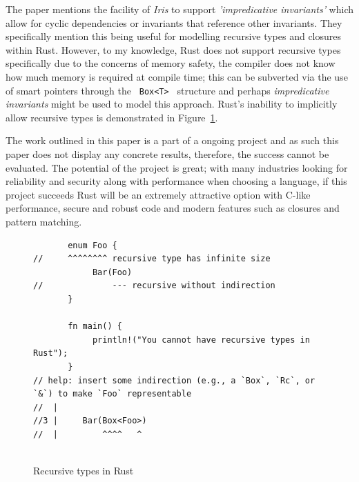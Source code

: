 \documentclass[11pt]{article}
\begin{document}
The paper mentions the facility of \textit{Iris} to support \textit{'impredicative invariants'} which allow for cyclic dependencies or invariants that reference other invariants. They specifically mention this being useful for modelling recursive types and closures within Rust. However, to my knowledge, Rust does not support recursive types specifically due to the concerns of memory safety, the compiler does not know how much memory is required at compile time; this can be subverted via the use of smart pointers through the \texttt{ Box<T> } structure and perhaps \textit{impredicative invariants} might be used to model this approach. Rust's inability to implicitly allow recursive types is demonstrated in Figure~\ref{fig:1}.   

The work outlined in this paper is a part of a ongoing project and as such this paper does not display any concrete results, therefore, the success cannot be evaluated. The potential of the project is great; with many industries looking for reliability and security along with performance when choosing a language, if this project succeeds Rust will be an extremely attractive option with C-like performance, secure and robust code and modern features such as closures and pattern matching.

\begin{figure}[!ht]
    \centering
    \begin{verbatim}
       enum Foo { 
//     ^^^^^^^^ recursive type has infinite size
            Bar(Foo)
//              --- recursive without indirection
       }

       fn main() {
            println!("You cannot have recursive types in Rust");
       }
// help: insert some indirection (e.g., a `Box`, `Rc`, or `&`) to make `Foo` representable
//  |
//3 |     Bar(Box<Foo>)
//  |         ^^^^   ^
      
    \end{verbatim}
    \caption{Recursive types in Rust}%
    \label{fig:1}
\end{figure}

\clearpage


\end{document}
